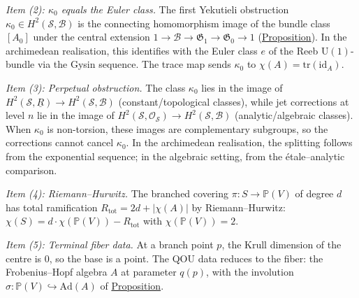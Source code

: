 \begin{theorem}
\emph{Item (2): $\kappa_0$ equals the Euler class.}
The first Yekutieli obstruction $\kappa_0 \in H^2(\mathcal{S}, \mathcal{B})$
is the connecting homomorphism image of the bundle class $[A_0]$ under the
central extension $1 \to \mathcal{B} \to \mathfrak{G}_1 \to \mathfrak{G}_0
\to 1$ (\hyperref[prop:yekutieli-lifting]{Proposition}).  In the archimedean
realisation, this identifies with the Euler class $e$ of the Reeb
$\mathrm{U}(1)$-bundle via the Gysin sequence.  The trace map sends
$\kappa_0$ to $\chi(A) = \mathrm{tr}(\mathrm{id}_A)$.

\emph{Item (3): Perpetual obstruction.}
The class $\kappa_0$ lies in the image of $H^2(\mathcal{S}, \underline{R})
\to H^2(\mathcal{S}, \mathcal{B})$ (constant/topological classes), while jet
corrections at level $n$ lie in the image of $H^2(\mathcal{S},
\mathcal{O}_{\mathcal{S}}) \to H^2(\mathcal{S}, \mathcal{B})$ (analytic/algebraic
classes).  When $\kappa_0$ is non-torsion, these images are complementary
subgroups, so the corrections cannot cancel $\kappa_0$.  In the archimedean
realisation, the splitting follows from the exponential sequence; in the
algebraic setting, from the étale--analytic comparison.

\emph{Item (4): Riemann--Hurwitz.}
The branched covering $\pi \colon S \to \mathbb{P}(V)$ of degree $d$ has
total ramification $R_{\mathrm{tot}} = 2d + \lvert\chi(A)\rvert$ by
Riemann--Hurwitz: $\chi(S) = d \cdot \chi(\mathbb{P}(V)) - R_{\mathrm{tot}}$
with $\chi(\mathbb{P}(V)) = 2$.

\emph{Item (5): Terminal fiber data.}
At a branch point $p$, the Krull dimension of the centre is $0$, so the base
is a point.  The QOU data reduces to the fiber: the Frobenius--Hopf
algebra $A$ at parameter $q(p)$, with the involution
$\sigma \colon \mathbb{P}(V) \hookrightarrow \mathrm{Ad}(A)$ of
\hyperref[prop:fiber-adjoint-involution]{Proposition}.
\end{theorem}
